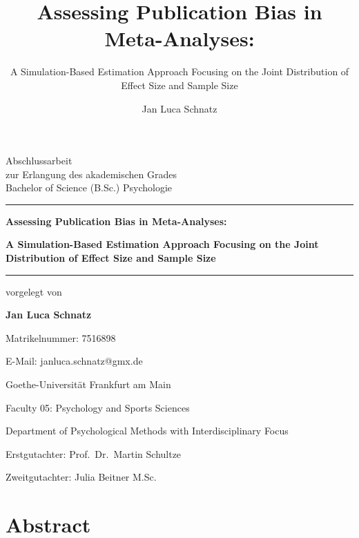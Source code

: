 \documentclass[
  12pt,
]{scrartcl}
\title{Assessing Publication Bias in Meta-Analyses:}
\subtitle{A Simulation-Based Estimation Approach Focusing on the Joint
Distribution of Effect Size and Sample Size}
\author{Jan Luca Schnatz}
\date{}
\begin{document}
\thispagestyle{empty}
{\centering
Abschlussarbeit \\
zur Erlangung des akademischen Grades \\
Bachelor of Science (B.Sc.) Psychologie \\
\vspace*{10mm}
\hrule
\vspace*{15mm}
{\large\bfseries Assessing Publication Bias in Meta-Analyses: \par}
{\large\bfseries A Simulation-Based Estimation Approach Focusing on the
Joint Distribution of Effect Size and Sample Size \par}

\vspace*{15mm}
\hrule
\vspace*{10mm}
vorgelegt von  \\ 
{\large\bfseries Jan Luca Schnatz \par}
\smallskip
{Matrikelnummer: 7516898 \par}
{E-Mail: janluca.schnatz@gmx.de \par}

\bigskip 

{\textmd\large  \par}

{\textmd\large Goethe-Universität Frankfurt am Main \par}
{\textmd\large Faculty 05: Psychology and Sports Sciences \par}
{\textmd\large Department of Psychological Methods with
Interdisciplinary Focus \par}

\bigskip\bigskip\bigskip

{Erstgutachter: Prof.~Dr.~Martin Schultze \par}
{Zweitgutachter: Julia Beitner M.Sc. \par}
%

\vspace*{10mm}


}

\newpage
{}
\thispagestyle{empty}

\newpage

\mbox{}\thispagestyle{empty}\newpage

\section*{Abstract}\label{abstract}
\end{document}
